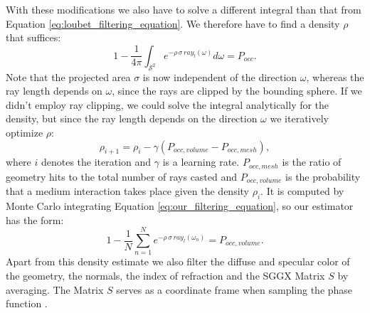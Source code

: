 With these modifications we also have to solve a different integral than that from Equation \ref{eq:loubet_filtering_equation}.
We therefore have to find a density $\rho$ that suffices:
\begin{equation}
    1 - \frac{1}{4\pi}\int_{\mathcal{S}^2} e^{-\rho \, \sigma \, ray_l(\omega)} d\omega = P_{occ}.
    \label{eq:our_filtering_equation}
\end{equation}
Note that the projected area $\sigma$ is now independent of the direction $\omega$, whereas the ray length depends on $\omega$, since the rays are clipped by the bounding sphere.
If we didn't employ ray clipping, we could solve the integral analytically for the density, but since the ray length depends on the direction $\omega$ we iteratively optimize $\rho$:
\begin{equation*}
    \rho_{i+1}=\rho_i - \gamma (P_{occ,volume} - P_{occ,mesh}),
\end{equation*}
where $i$ denotes the iteration and $\gamma$ is a learning rate.
$P_{occ,mesh}$ is the ratio of geometry hits to the total number of rays casted and $P_{occ,volume}$ is the probability that a medium interaction takes place given the density $\rho_i$.
It is computed by Monte Carlo integrating Equation \ref{eq:our_filtering_equation}, so our estimator has the form:
\begin{equation*}
    1 - \frac{1}{N}\sum_{n=1}^{N} e^{-\rho \, \sigma \, ray_l(\omega_n)} = P_{occ,volume}.
\end{equation*}
Apart from this density estimate we also filter the diffuse and specular color of the geometry, the normals, the index of refraction and the SGGX Matrix $S$ by averaging.
The Matrix $S$ serves as a coordinate frame when sampling the phase function \cite{sggx}.

